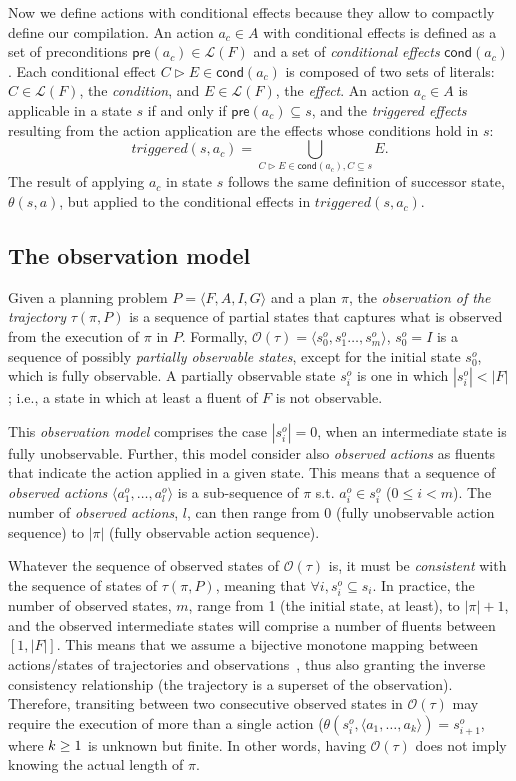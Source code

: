 \documentclass[runningheads]{llncs}
\newcommand{\tup}[1]{{\langle #1 \rangle}}
\newcommand{\pre}{\mathsf{pre}}     %
\newcommand{\cond}{\mathsf{cond}}   %
\begin{document}
Now we define actions with conditional effects because they allow to compactly define our compilation. An action $a_c\in A$ with conditional effects is defined as a set of preconditions $\pre(a_c)\in\mathcal{L}(F)$ and a set of {\em conditional effects} $\cond(a_c)$. Each conditional effect $C\rhd E\in\cond(a_c)$ is composed of two sets of literals: $C\in\mathcal{L}(F)$, the {\em condition}, and $E\in\mathcal{L}(F)$, the {\em effect}. An action $a_c\in A$ is applicable in a state $s$ if and only if $\pre(a_c)\subseteq s$, and the {\em triggered effects} resulting from the action application are the effects whose conditions hold in $s$:
\[
triggered(s,a_c)=\bigcup\limits_{C\rhd E\in\cond(a_c),C\subseteq s} E. 
\]
The result of applying $a_c$ in state $s$ follows the same definition of successor state, $\theta(s,a)$, but applied to the conditional effects in $triggered(s,a_c)$.

\subsection{The observation model}
Given a planning problem $P=\tup{F,A,I,G}$ and a plan $\pi$, the \emph{observation of the trajectory} $\tau(\pi,P)$ is a sequence of partial states that captures what is observed from the execution of $\pi$ in $P$. Formally, $\mathcal{O}(\tau)=\tup{s_0^o,s_1^o \ldots , s_m^o}$, $s_0^o=I$ is a sequence of possibly {\em partially observable states}, except for the initial state $s_0^o$, which is fully observable. A partially observable state $s_i^o$ is one in which $|s_i^o| < |F|$; i.e., a state in which at least a fluent of $F$ is not observable.

This {\em observation model} comprises the case $|s_i^o| = 0$, when an intermediate state is fully unobservable. Further, this model consider also {\em observed actions} as fluents that indicate the action applied in a given state. This means that a sequence of {\em observed actions} $\tup{a_1^o, \ldots, a_l^o}$ is a sub-sequence of $\pi$ s.t. $a_i^o\in s_i^o$ ({\small $0\leq i <m$}).  The number of {\em observed actions}, $l$, can then range from $0$ (fully unobservable action sequence) to $|\pi|$ (fully observable action sequence).


Whatever the sequence of observed states of $\mathcal{O}(\tau)$ is, it must be {\em consistent} with the sequence of states of $\tau(\pi,P)$, meaning that $\forall i, s_i^o \subseteq s_i$. In practice, the number of observed states, $m$, range from 1 (the initial state, at least), to $|\pi|+1$, and the observed intermediate states will comprise a number of fluents between $[1,|F|]$.  This means that we assume a bijective monotone mapping between actions/states of trajectories and observations~\cite{ramirez2009plan}, thus also granting the inverse consistency relationship (the trajectory is a superset of the observation). Therefore, transiting between two consecutive observed states in $\mathcal{O}(\tau)$ may require the execution of more than a single action ($\theta(s_i^o,\tup{a_1,\ldots,a_k})=s_{i+1}^o$, where ${\small k\geq 1}$ is unknown but finite. In other words, having $\mathcal{O}(\tau)$ does not imply knowing the actual length of $\pi$.
\end{document}
